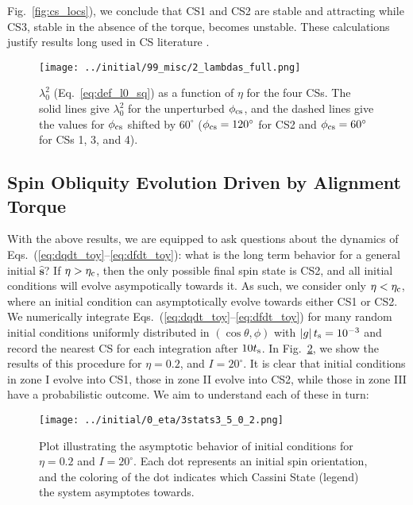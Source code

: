 \documentclass[
        fleqn,
        usenatbib,
    ]{mnras}
\newcommand*{\abs}[1]{\left|#1\right|}
\newcommand*{\p}[1]{\left(#1\right)}
\newcommand*{\uv}[1]{\hat{\mathbf{#1}}}
\begin{document}
Fig.~\ref{fig:cs_locs}), we conclude that CS1 and CS2 are stable and attracting
while CS3, stable in the absence of the torque, becomes unstable. These
calculations justify results long used in CS literature
\citep[e.g.][]{ward1975tidal, fabrycky_otides}.
\begin{figure}
    \centering
    \texttt{[image: ../initial/99\_misc/2\_lambdas\_full.png]}
    \caption{$\lambda_0^2$ (Eq.~\ref{eq:def_l0_sq}) as a function of $\eta$ for
    the four CSs. The solid lines give $\lambda_0^2$ for the unperturbed
    $\phi_{\rm cs}$, and the dashed lines give the values for $\phi_{\rm cs}$
    shifted by $60^\circ$ ($\phi_{\rm cs} = 120^\circ$ for CS2 and $\phi_{\rm
    cs} = 60^\circ$ for CSs 1, 3, and 4).
    }\label{fig:lambda_full}
\end{figure}

\subsection{Spin Obliquity Evolution Driven by Alignment
Torque}\label{ss:toy_outcomes}

With the above results, we are equipped to ask questions about the dynamics of
Eqs.~(\ref{eq:dqdt_toy}--\ref{eq:dfdt_toy}): what is the long term behavior for
a general initial $\uv{s}$? If $\eta > \eta_{\rm c}$, then the only possible
final spin state is CS2, and all initial conditions will evolve asympotically
towards it. As such, we consider only $\eta < \eta_{\rm c}$, where an initial
condition can asymptotically evolve towards either CS1 or CS2. We numerically
integrate Eqs.~(\ref{eq:dqdt_toy}--\ref{eq:dfdt_toy}) for many random initial
conditions uniformly distributed in $\p{\cos \theta, \phi}$ with $\abs{g}t_{\rm
s} = 10^{-3}$ and record the nearest CS for each integration after $10t_{\rm
s}$. In Fig.~\ref{fig:toy_phop}, we show the results of this procedure for $\eta
= 0.2$, and $I = 20^\circ$. It is clear that initial conditions in zone I evolve
into CS1, those in zone II evolve into CS2, while those in zone III have a
probabilistic outcome. We aim to understand each of these in turn:
\begin{figure}
    \centering
    \texttt{[image: ../initial/0\_eta/3stats3\_5\_0\_2.png]}
    \caption{Plot illustrating the asymptotic behavior of initial conditions for
    $\eta = 0.2$ and $I = 20^\circ$. Each dot represents an initial spin
    orientation, and the coloring of the dot indicates which Cassini State
    (legend) the system asymptotes towards.}\label{fig:toy_phop}
\end{figure}
\end{document}
